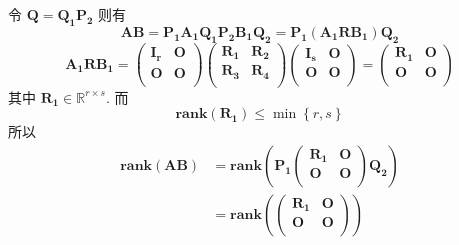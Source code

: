 \documentclass[11pt,letter,notitlepage]{article}
\newcommand{\rank}[1]{ \textbf{rank}  (#1)  }
\begin{document}
\begin{solution}
\begin{enumerate}
\begin{enumerate}
			            令 $\mathbf{Q}=\mathbf{Q_1}\mathbf{P_2}$ 则有
			            $$\mathbf{A}\mathbf{B}
				            =\mathbf{P_1}\mathbf{A_1}\mathbf{Q_1}\mathbf{P_2}\mathbf{B_1}\mathbf{Q_2}
				            =\mathbf{P_1} \left(\mathbf{A_1}\mathbf{R}\mathbf{B_1}\right) \mathbf{Q_2}$$
			            $$\mathbf{A_1}\mathbf{R}\mathbf{B_1}
				            =\begin{pmatrix}
					            \mathbf{I_r} & \mathbf{O} \\
					            \mathbf{O}   & \mathbf{O} \\
				            \end{pmatrix}
				            \begin{pmatrix}
					            \mathbf{R_1} & \mathbf{R_2} \\
					            \mathbf{R_3} & \mathbf{R_4} \\
				            \end{pmatrix}
				            \begin{pmatrix}
					            \mathbf{I_s} & \mathbf{O} \\
					            \mathbf{O}   & \mathbf{O} \\
				            \end{pmatrix}
				            =\begin{pmatrix}
					            \mathbf{R_1} & \mathbf{O} \\
					            \mathbf{O}   & \mathbf{O} \\
				            \end{pmatrix}$$
			            其中 $\mathbf{R_1} \in \mathbb{R}^{r\times s}$. 而
			            $$\rank{\mathbf{R_1}} \le \min \left\{r, s\right\}$$
			            所以
			            $$\begin{aligned}
					            \rank{\mathbf{A}\mathbf{B}}
					             & = \rank{\mathbf{P_1}
						            \begin{pmatrix}
							            \mathbf{R_1} & \mathbf{O} \\
							            \mathbf{O}   & \mathbf{O} \\
						            \end{pmatrix}
						            \mathbf{Q_2}}                                                   \\
					             & = \rank{\begin{pmatrix}
							            \mathbf{R_1} & \mathbf{O} \\
							            \mathbf{O}   & \mathbf{O} \\

\end{pmatrix}}
\end{aligned}$$
\end{enumerate}
\end{enumerate}
\end{solution}
\end{document}

